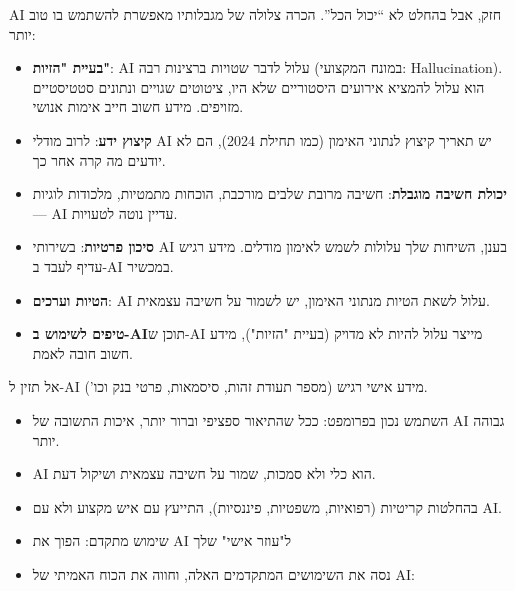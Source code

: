 
AI חזק, אבל בהחלט לא “יכול הכל”. הכרה צלולה של מגבלותיו מאפשרת להשתמש בו טוב יותר:

\begin{itemize}
  \item \textbf{בעיית "הזיות"}: AI עלול לדבר שטויות ברצינות רבה (במונח המקצועי: Hallucination). הוא עלול להמציא אירועים היסטוריים שלא היו, ציטוטים שגויים ונתונים סטטיסטיים מזויפים. מידע חשוב חייב אימות אנושי.
  \item \textbf{קיצוץ ידע}: לרוב מודלי AI יש תאריך קיצוץ לנתוני האימון (כמו תחילת 2024), הם לא יודעים מה קרה אחר כך.
  \item \textbf{יכולת חשיבה מוגבלת}: חשיבה מרובת שלבים מורכבת, הוכחות מתמטיות, מלכודות לוגיות — AI עדיין נוטה לטעויות.
  \item \textbf{סיכון פרטיות}: בשירותי AI בענן, השיחות שלך עלולות לשמש לאימון מודלים. מידע רגיש עדיף לעבד ב-AI במכשיר.
  \item \textbf{הטיות וערכים}: AI עלול לשאת הטיות מנתוני האימון, יש לשמור על חשיבה עצמאית.
  \item \textbf{טיפים לשימוש ב-AI}תוכן ש-AI מייצר עלול להיות לא מדויק (בעיית "הזיות"), מידע חשוב חובה לאמת.
\end{itemize}

\begin{tcbinfo}{אל תזין ל-AI מידע אישי רגיש (מספר תעודת זהות, סיסמאות, פרטי בנק וכו').}
\begin{itemize}
  \item השתמש נכון בפרומפט: ככל שהתיאור ספציפי וברור יותר, איכות התשובה של AI גבוהה יותר.
  \item AI הוא כלי ולא סמכות, שמור על חשיבה עצמאית ושיקול דעת.
  \item בהחלטות קריטיות (רפואיות, משפטיות, פיננסיות), התייעץ עם איש מקצוע ולא עם AI.
  \item שימוש מתקדם: הפוך את AI ל"עוזר אישי" שלך
  \item נסה את השימושים המתקדמים האלה, וחווה את הכוח האמיתי של AI:
\end{itemize}

\end{tcbinfo}

